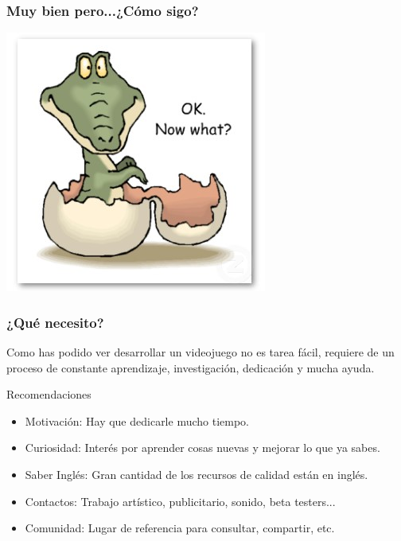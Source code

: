 

\begin{frame}
	\frametitle{Muy bien pero...¿Cómo sigo?}
	
	\begin{center}
		\includegraphics[scale=0.40]{img/nowwhat.jpg}
	\end{center}

\end{frame}


\begin{frame}
	\frametitle{¿Qué necesito?}
	
	Como has podido ver desarrollar un videojuego no es tarea fácil, requiere de un proceso de constante aprendizaje, investigación, dedicación y mucha ayuda.
		
	\begin{block}{Recomendaciones}
		\begin{itemize}
			\item Motivación: Hay que dedicarle mucho tiempo.
			\item Curiosidad: Interés por aprender cosas nuevas y mejorar lo que ya sabes.
			\item Saber Inglés: Gran cantidad de los recursos de calidad están en inglés.
			\item Contactos: Trabajo artístico, publicitario, sonido, beta testers...
			\item Comunidad: Lugar de referencia para consultar, compartir, etc.
		\end{itemize}
	\end{block}

\end{frame}

